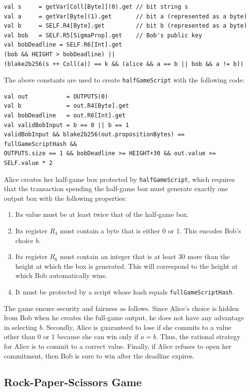 \documentclass[11pt]{article}
\begin{document}
\begin{verbatim}
val s     = getVar[Coll[Byte]](0).get // bit string s
val a     = getVar[Byte](1).get       // bit a (represented as a byte)
val b     = SELF.R4[Byte].get         // bit b (represented as a byte)
val bob   = SELF.R5[SigmaProp].get    // Bob's public key
val bobDeadline = SELF.R6[Int].get
(bob && HEIGHT > bobDeadline) || 
(blake2b256(s ++ Coll(a)) == k && (alice && a == b || bob && a != b))
\end{verbatim}
The above constants are used to create \texttt{halfGameScript} with the following code:
\begin{verbatim}
val out           = OUTPUTS(0)
val b             = out.R4[Byte].get
val bobDeadline   = out.R6[Int].get
val validBobInput = b == 0 || b == 1
validBobInput && blake2b256(out.propositionBytes) == fullGameScriptHash &&
OUTPUTS.size == 1 && bobDeadline >= HEIGHT+30 && out.value >= SELF.value * 2 
\end{verbatim}

Alice creates her half-game box protected by \texttt{halfGameScript}, which requires that the transaction spending the half-game box must generate exactly one output box with the following properties:

\begin{enumerate}
	\item Its value must be at least twice that of the half-game box.
	\item Its register $R_4$ must contain a byte that is either 0 or 1. This encodes Bob's choice $b$.
	\item Its register $R_6$ must contain an integer that is at least 30 more than the height at which the box is generated. This will correspond to the height at which Bob automatically wins.
	\item It must be protected by a script whose hash equals \texttt{fullGameScriptHash}.
\end{enumerate}
 
The game ensure security and fairness as follows. Since Alice's choice is hidden from Bob when he creates the full-game output, he does not have any advantage in selecting $b$. Secondly, Alice is guaranteed to lose if she commits to a value other than 0 or 1 because she can win only if $a = b$. 
Thus, the rational strategy for Alice is to commit to a correct value. Finally, if Alice refuses to open her commitment, then Bob is sure to win after the deadline expires. 

\subsection{Rock-Paper-Scissors Game}
\end{document}
